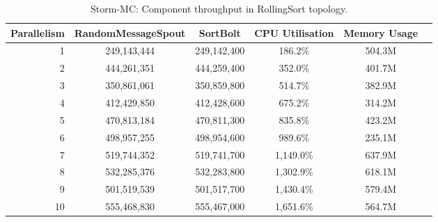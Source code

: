 \documentclass[bsc,deptreport,twoside,singlespacing,normalheadings,parskip]{infthesis}\usepackage[]{graphicx}\usepackage[]{color}
\begin{document}
\begin{table}[!htb]
\begin{adjustwidth}{-0.5in}{-0.5in}
\centering
\small
\begin{tabular}{@{}rccccl@{}}
    \textbf{Parallelism} & \textbf{RandomMessageSpout} & \textbf{SortBolt} & \textbf{CPU Utilisation} & \textbf{Memory Usage} \\ \toprule
    1 & {249,143,444} & {249,142,400} & {186.2\%} & {504.3M} \\
    2 & {444,261,351} & {444,259,400} & {352.0\%} & {401.7M} \\
    3 & {350,861,061} & {350,859,800} & {514.7\%} & {382.9M} \\
    4 & {412,429,850} & {412,428,600} & {675.2\%} & {314.2M} \\
    5 & {470,813,184} & {470,811,300} & {835.8\%} & {423.2M} \\
    6 & {498,957,255} & {498,954,600} & {989.6\%} & {235.1M} \\
    7 & {519,744,352} & {519,741,700} & {1,149.0\%} & {637.9M} \\
    8 & {532,285,376} & {532,283,800} & {1,302.9\%} & {618.1M} \\
    9 & {501,519,539} & {501,517,700} & {1,430.4\%} & {579.4M} \\
    10 & {555,468,830} & {555,467,000} & {1,651.6\%} & {564.7M} \\ 
\end{tabular}
\caption{Storm-MC: Component throughput in RollingSort topology.}
\label{table:storm_mc_rolling}
\end{adjustwidth}
\end{table}
\end{document}
